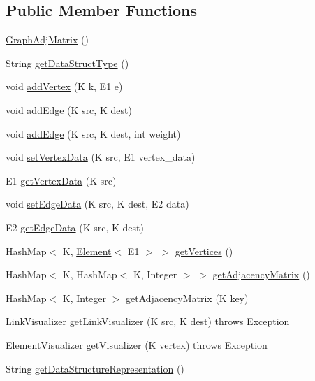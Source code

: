 \subsection*{Public Member Functions}
\begin{DoxyCompactItemize}
\item 
\hyperlink{classbridges_1_1base_1_1_graph_adj_matrix_a8af4a2575890c3e68da7b39d800267bb}{Graph\+Adj\+Matrix} ()
\item 
String \hyperlink{classbridges_1_1base_1_1_graph_adj_matrix_a16ee088c4c53a9a5cdf3fbbad25cd1af}{get\+Data\+Struct\+Type} ()
\item 
void \hyperlink{classbridges_1_1base_1_1_graph_adj_matrix_a27b5ddb10a6615693460955b6bb3ee0c}{add\+Vertex} (K k, E1 e)
\item 
void \hyperlink{classbridges_1_1base_1_1_graph_adj_matrix_a477fbb5abbed6988e67b4b46b571e87c}{add\+Edge} (K src, K dest)
\item 
void \hyperlink{classbridges_1_1base_1_1_graph_adj_matrix_ad9b05b61e9592fa94045d7b59971b206}{add\+Edge} (K src, K dest, int weight)
\item 
void \hyperlink{classbridges_1_1base_1_1_graph_adj_matrix_a22eee632463a665e7016cf50916dfd83}{set\+Vertex\+Data} (K src, E1 vertex\+\_\+data)
\item 
E1 \hyperlink{classbridges_1_1base_1_1_graph_adj_matrix_a36308a365d1c0f137ffb9a8e76a630f1}{get\+Vertex\+Data} (K src)
\item 
void \hyperlink{classbridges_1_1base_1_1_graph_adj_matrix_a72fe8bd594e3da28ba6e412de88576da}{set\+Edge\+Data} (K src, K dest, E2 data)
\item 
E2 \hyperlink{classbridges_1_1base_1_1_graph_adj_matrix_a3a3795c994ef9033ddb0b1d97029350b}{get\+Edge\+Data} (K src, K dest)
\item 
Hash\+Map$<$ K, \hyperlink{classbridges_1_1base_1_1_element}{Element}$<$ E1 $>$ $>$ \hyperlink{classbridges_1_1base_1_1_graph_adj_matrix_a6a000a302a1082bc2c55fbe8f511fce4}{get\+Vertices} ()
\item 
Hash\+Map$<$ K, Hash\+Map$<$ K, Integer $>$ $>$ \hyperlink{classbridges_1_1base_1_1_graph_adj_matrix_abe7f26cb9874744bc044df18b5d0eb84}{get\+Adjacency\+Matrix} ()
\item 
Hash\+Map$<$ K, Integer $>$ \hyperlink{classbridges_1_1base_1_1_graph_adj_matrix_a43f830cfe126f2be351f6d8c2fccc569}{get\+Adjacency\+Matrix} (K key)
\item 
\hyperlink{classbridges_1_1base_1_1_link_visualizer}{Link\+Visualizer} \hyperlink{classbridges_1_1base_1_1_graph_adj_matrix_a434454a6c8a1fac612392dcf1951dc9d}{get\+Link\+Visualizer} (K src, K dest)  throws Exception 
\item 
\hyperlink{classbridges_1_1base_1_1_element_visualizer}{Element\+Visualizer} \hyperlink{classbridges_1_1base_1_1_graph_adj_matrix_a4358ebee834c69796479a4ee6dfd96b3}{get\+Visualizer} (K vertex)  throws Exception 
\item 
String \hyperlink{classbridges_1_1base_1_1_graph_adj_matrix_ab0786f047bd0c8c47f19d632a1f03eaa}{get\+Data\+Structure\+Representation} ()
\end{DoxyCompactItemize}
